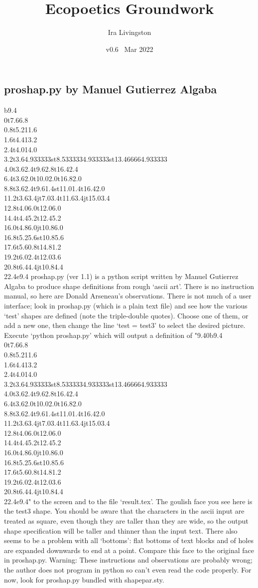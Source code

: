 \documentclass[draft]{article}
\title{Ecopoetics Groundwork}
\author{Ira Livingston}
\date{v0.6 \ Mar 2022}
\begin{document}
\maketitle
\subsection{proshap.py by Man\-uel Gu\-ti\-er\-rez Al\-ga\-ba}
\gdef\bassshape{{9.4}{0}b{9.4}
\\{0}t{7.6}{6.8}
\\{0.8}t{5.2}{11.6}
\\{1.6}t{4.4}{13.2}
\\{2.4}t{4.0}{14.0}
\\{3.2}t{3.6}{4.933333}st{8.533333}{4.933333}st{13.46666}{4.933333}
\\{4.0}t{3.6}{2.4}t{9.6}{2.8}t{16.4}{2.4}
\\{6.4}t{3.6}{2.0}t{10.0}{2.0}t{16.8}{2.0}
\\{8.8}t{3.6}{2.4}t{9.6}{1.4}st{11.0}{1.4}t{16.4}{2.0}
\\{11.2}t{3.6}{3.4}jt{7.0}{3.4}t{11.6}{3.4}jt{15.0}{3.4}
\\{12.8}t{4.0}{6.0}t{12.0}{6.0}
\\{14.4}t{4.4}{5.2}t{12.4}{5.2}
\\{16.0}t{4.8}{6.0}jt{10.8}{6.0}
\\{16.8}t{5.2}{5.6}st{10.8}{5.6}
\\{17.6}t{5.6}{0.8}t{14.8}{1.2}
\\{19.2}t{6.0}{2.4}t{12.0}{3.6}
\\{20.8}t{6.4}{4.4}jt{10.8}{4.4}
\\{22.4}e{9.4}}


\shapepar\bassshape
proshap.py (ver 1.1) is a python script written by Man\-uel
Gu\-ti\-er\-rez Al\-ga\-ba to produce shape definitions from rough
`ascii art'.  There is no instruction manual, so here are Donald
Arseneau's observations. There is not much of a user interface; look
in proshap.py (which is a plain text file) and see how the various
`test' shapes are defined (note the triple-double quotes).  Choose
one of them, or add a new one, then change the line `test = test3' to select
the desired picture.  Execute `python proshap.py' which will output a
definition of "\bassshape" to the screen and to the file `result.tex'.
The goul\-ish face you see here is the test3 shape.  You should be
aware that the characters in the ascii input are treated as square,
even though they are taller than they are wide, so the output shape
specification will be taller and thinner than the input text.  There
also seems to be a problem with all `bottoms': flat bottoms of text
blocks and of holes are expanded downwards to end at a point.  Compare
this face to the original face in proshap.py.  Warning: These
instructions and observations are probably wrong; the author does not
program in python so can't even read the code properly.  For now, look
for proshap.py bundled with shapepar.sty.
\end{document}
